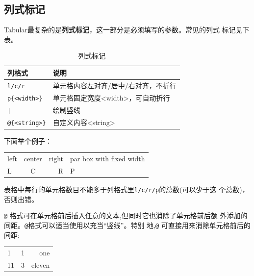 \documentclass{article}
\begin{document}
\subsection{列式标记}

Tabular最复杂的是\textbf{列式标记}，这一部分是必须填写的参数。常见的列式
标记见下表。

\begin{table}[H]
  \centering
  \caption{列式标记}
  \label{tab:col-spec}
  \begin{tabular}{ll}
    \toprule
    \textbf{列格式}  & \textbf{说明} \\
    \midrule
    \verb!l/c/r!   & 单元格内容左对齐/居中/右对齐，不折行 \\
    \verb!p{<width>}!  & 单元格固定宽度<width>，可自动折行 \\
    \verb!|!       & 绘制竖线 \\
    \verb!@{<string>}!  & 自定义内容<string> \\
    \bottomrule
  \end{tabular}
\end{table}

下面举个例子：

\begin{table}[H]
  \centering
  \begin{tabular}{lcr|p{6em}}
    \hline
    left & center & right & par box with fixed width\\
    L & C & R & P \\
    \hline
  \end{tabular}
\end{table}

表格中每行的单元格数目不能多于列格式里\texttt{l/c/r/p}的总数(可以少于这
个总数)，否则出错。

\texttt{@} 格式可在单元格前后插入任意的文本,但同时它也消除了单元格前后额
外添加的间距。\texttt{@}格式可以适当使用以充当“竖线”。特别
地,\texttt{@{}} 可直接用来消除单元格前后的间距:

\begin{table}[H]
  \centering
  \begin{tabular}{@{}l @{:}l  r@{}}
    \hline
    1 & 1 & one \\
    11 & 3 & eleven \\
    \hline
  \end{tabular}
\end{table}
\end{document}
